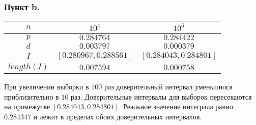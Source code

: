 \documentclass[a4paper,fontsize=13pt]{article}
\begin{document}
\subsubsection*{Пункт b.}


\begin{center}
\begin{tabular}{| c | c | c |}
\hline
 $n$ & $10^4$ & $10^6$ \\ 
 \hline
 $p$ & $0.284764$ & $0.284422$ \\  
 \hline
 $d$ & $0.003797$ & $0.000379$ \\  
 \hline
 $I$ & $[0.280967, 0.288561]$ & $[0.284043, 0.284801]$ \\
 \hline
 $length(I)$ & $0.007594$ & $0.000758$ \\
 \hline
\end{tabular}
\end{center}

При увеличении выборки в $100$ раз доверительный интервал уменьшился приблизительно в $10$ раз. Доверительные интервалы для выборок пересекаются на промежутке $[0.284043, 0.284801]$. Реальное значение интеграла равно $0.284347$ и лежит в пределах обоих доверительных интервалов.
\end{document}
